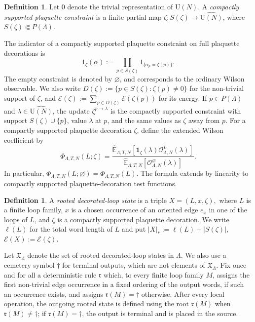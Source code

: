\documentclass[11pt,a4paper,reqno]{amsart}
\theoremstyle{definition}
\newtheorem{definition}[theorem]{Definition}
\theoremstyle{remark}
\newcommand\U{{\mathrm U}}
\newcommand\E{{\mathbb E}}
\begin{document}
\begin{definition}
Let $0$ denote the trivial representation of $\U(N)$. A \emph{compactly supported plaquette constraint} is a finite partial map $\zeta:S(\zeta)\longrightarrow \widehat{\U(N)}$, where $S(\zeta)\Subset P(\Lambda).$
\end{definition}
The indicator of a compactly supported plaquette constraint on full plaquette decorations is
\[
1_\zeta(\alpha):=\prod_{p\in S(\zeta)}1_{\{\alpha_p=\zeta(p)\}} .
\]
The empty constraint is denoted by $\varnothing$, and corresponds to the ordinary Wilson observable. We also write $D(\zeta):=\{p\in S(\zeta):\zeta(p)\neq 0\}$ for the non-trivial support of $\zeta$, and $\mathcal E(\zeta):=\sum_{p\in D(\zeta)}\mathcal E(\zeta(p))$ for its energy. If $p\in P(\Lambda)$ and $\lambda\in\widehat{\U(N)}$, the update
$\zeta^{p\to\lambda}$ is the compactly supported constraint with support $S(\zeta)\cup\{p\}$, value $\lambda$ at $p$, and the same values as $\zeta$
away from $p$. For a compactly supported plaquette decoration $\zeta$, define the extended Wilson coefficient by
\begin{equation}\label{eq:atomic-extended-coef}
\Phi_{\Lambda,T,N}(L;\zeta)
=
\frac{
\widehat\E_{\Lambda,T,N}\left[\mathbf 1_\zeta(\lambda)\mathcal O^L_{\Lambda,N}(\lambda)\right]
}{
\widehat\E_{\Lambda,T,N}\left[\mathcal O^\varnothing_{\Lambda,N}(\lambda)\right]
}.
\end{equation}
In particular, $\Phi_{\Lambda,T,N}(L;\varnothing)=\Phi_{\Lambda,T,N}(L).$ The formula extends by linearity to compactly supported plaquette-decoration test functions.

\begin{definition}\label{def:rooted-spectral-loop-states}
A \emph{rooted decorated-loop state} is a triple $X=(L,x,\zeta),$ where $L$ is a finite loop family, $x$ is a chosen occurrence of an oriented edge $e_x$ in one of the loops of $L$, and $\zeta$ is a compactly supported plaquette decoration.  We write $\ell(L)$ for the total word length of $L$ and put $|X|_*:=\ell(L)+|S(\zeta)|,$ $\mathcal E(X):=\mathcal E(\zeta).$
\end{definition}

Let $\mathfrak X_\Lambda$ denote the set of rooted decorated-loop states in $\Lambda$. We also use a cemetery symbol $\dagger$ for terminal outputs, which are not elements of $\mathfrak X_\Lambda$. Fix once and for all a deterministic rule $\mathfrak r$ which, to every finite loop family $M$, assigns the first non-trivial edge occurrence in a fixed ordering of the output words, if such an occurrence exists, and assigns $\mathfrak r(M)=\dagger$ otherwise. After every local operation, the outgoing rooted state is defined using the root $\mathfrak r(M)$ when $\mathfrak r(M)\ne\dagger$; if $\mathfrak r(M)=\dagger$, the output is terminal and is placed in the source.
\end{document}
